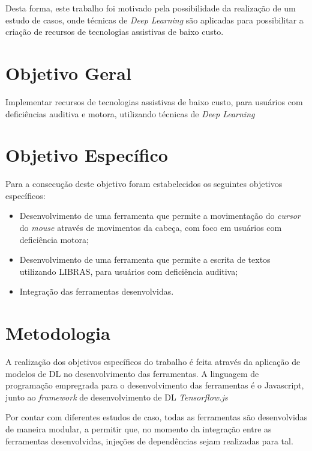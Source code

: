 \par Desta forma, este trabalho foi motivado pela possibilidade da realização de um estudo de casos, onde técnicas de \textit{Deep Learning} são aplicadas para possibilitar a criação de recursos de tecnologias assistivas de baixo custo.

\section{Objetivo Geral} %

\par Implementar recursos de tecnologias assistivas de baixo custo, para usuários com deficiências auditiva e motora, utilizando técnicas de \textit{Deep Learning}

\section{Objetivo Espec\'ifico}

\par Para a consecução deste objetivo foram estabelecidos os seguintes objetivos específicos:

\begin{itemize}
    \item Desenvolvimento de uma ferramenta que permite a movimentação do \textit{cursor} do \textit{mouse} através de movimentos da cabeça, com foco em usuários com deficiência motora;
    \item Desenvolvimento de uma ferramenta que permite a escrita de textos utilizando LIBRAS, para usuários com deficiência auditiva;
    \item Integração das ferramentas desenvolvidas.
\end{itemize}

\section{Metodologia} %

A realização dos objetivos específicos do trabalho é feita através da aplicação de modelos de DL no desenvolvimento das ferramentas. A linguagem de programação empregrada para o desenvolvimento das ferramentas é o Javascript, junto ao \textit{framework} de desenvolvimento de DL \textit{Tensorflow.js}

Por contar com diferentes estudos de caso, todas as ferramentas são desenvolvidas de maneira modular, a permitir que, no momento da integração entre as ferramentas desenvolvidas, injeções de dependências sejam realizadas para tal.


